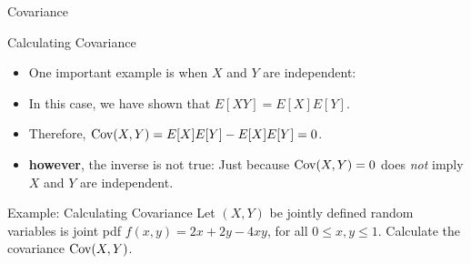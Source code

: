 \begin{frame}[allowframebreaks]{Covariance}
\begin{block}{Calculating Covariance}
  \end{block}
  
  
  \framebreak
  
  \begin{itemize}
    \item One important example is when $X$ and $Y$ are independent:
    \item In this case, we have shown that $E[XY] = E[X]E[Y]$.
    \item Therefore, $\mathrm{Cov}(X, Y) = E[X]E[Y] - E[X]E[Y] = 0$.
    \item \textbf{however}, the inverse is not true: Just because $\mathrm{Cov}(X, Y) = 0$ does \emph{not} imply $X$ and $Y$ are independent.
  \end{itemize}
  
  \framebreak
  
  \begin{exampleblock}{Example: Calculating Covariance}
    Let $(X, Y)$ be jointly defined random variables is joint pdf $f(x, y) = 2x + 2y - 4xy$, for all $0 \leq x, y \leq 1$. Calculate the covariance $\mathrm{Cov}(X, Y)$.
    

\end{exampleblock}
\end{frame}
